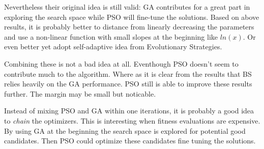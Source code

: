 \documentclass{acm_proc_article-sp}
\begin{document}
Nevertheless their original idea is still valid: GA contributes for a great part in exploring the search space while PSO will fine-tune the solutions. Based on above results, it is probably better to distance from linearly decreasing the parameters and use a non-linear function with small slopes at the beginning like $ln(x)$. Or even better yet adopt self-adaptive idea from Evolutionary Strategies.

Combining these is not a bad idea at all. Eventhough PSO doesn't seem to contribute much to the algorithm. Where as it is clear from the results that BS relies heavily on the GA performance. PSO still is able to improve these results further. The margin may be small but noticable. 

Instead of mixing PSO and GA within one iterations, it is probably a good idea to \emph{chain} the optimizers. This is interesting when fitness evaluations are expensive. By using GA at the beginning the search space is explored for potential good candidates. Then PSO could optimize these candidates fine tuning the solutions. 



\balancecolumns
\end{document}

